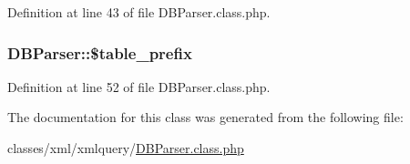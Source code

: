 Definition at line 43 of file D\-B\-Parser.\-class.\-php.

\hypertarget{classDBParser_aecad815ff642d9c918e97747d638dbf0}{
\subsubsection[{\$table\-\_\-prefix}]{\setlength{\rightskip}{0pt plus 5cm}D\-B\-Parser\-::\$table\-\_\-prefix}}\label{classDBParser_aecad815ff642d9c918e97747d638dbf0}


Definition at line 52 of file D\-B\-Parser.\-class.\-php.



The documentation for this class was generated from the following file\-:\begin{DoxyCompactItemize}
\item 
classes/xml/xmlquery/\hyperlink{DBParser_8class_8php}{D\-B\-Parser.\-class.\-php}\end{DoxyCompactItemize}
